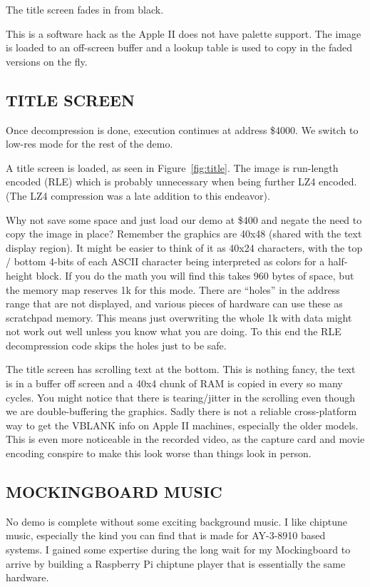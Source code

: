 \documentclass[twocolumn]{article}
\begin{document}
The title screen fades in from black.

This is a software hack as the Apple II does not have palette support.
The image is loaded to an off-screen buffer and a lookup table is used to
copy in the faded versions on the fly.

\subsection{TITLE SCREEN}


Once decompression is done, execution continues at address \$4000.
We switch to low-res mode for the rest of the demo.

A title screen is loaded, as seen in Figure~\ref{fig:title}.
The image is run-length encoded (RLE) which is
probably unnecessary when being further LZ4 encoded.
(The LZ4 compression was a late addition to this endeavor).

Why not save some space and just load our demo at \$400 and negate the need
to copy the image in place?
Remember the graphics are 40x48 (shared with the text display region).
It might be easier to think of it as 40x24 characters, with the top / bottom
4-bits of each ASCII character being interpreted as colors for a half-height
block.
If you do the math you will find this takes 960 bytes of space, but the memory
map reserves 1k for this mode.
There are ``holes'' in the address range that are not displayed, and 
various pieces of hardware can use these as scratchpad memory.  
This means just overwriting the whole 1k with data might not work out well
unless you know what you are doing.
To this end the RLE decompression code skips the holes just to be safe.

The title screen has scrolling text at the bottom.
This is nothing fancy, the text is in a buffer off screen and a 40x4 
chunk of RAM is copied in every so many cycles.
You might notice that there is tearing/jitter in the scrolling even
though we are double-buffering the graphics.  
Sadly there is not a reliable cross-platform way to get the VBLANK info 
on Apple II machines, especially the older models.
This is even more noticeable in the recorded video, as the capture card and
movie encoding conspire to make this look worse than things look in person.

\subsection{MOCKINGBOARD MUSIC}

No demo is complete without some exciting background music.
I like chiptune music, especially the kind you can find that is made
for AY-3-8910 based systems.
I gained some expertise during the long wait for my Mockingboard to arrive
by building a Raspberry Pi chiptune player that is essentially the same
hardware.
\end{document}
